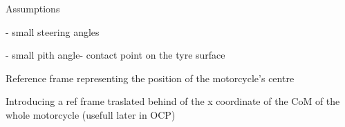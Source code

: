 \documentclass{article}
\begin{document}
\begin{maplegroup}
Assumptions
\end{maplegroup}
\begin{maplegroup}
\begin{Maple Normal}{
- small steering angles}\end{Maple Normal}

\begin{Maple Normal}{
- small pith angle- contact point on the tyre surface}\end{Maple Normal}
\end{maplegroup}
\begin{maplegroup}
\begin{Maple Normal}{
Reference frame representing the position of the motorcycle's centre}\end{Maple Normal}

\end{maplegroup}
\begin{maplegroup}
\begin{mapleinput}
\end{mapleinput}
\mapleresult
\begin{maplelatex}
\end{maplelatex}
\end{maplegroup}
\begin{maplegroup}
\begin{Maple Normal}{
Introducing a ref frame traslated behind of the x coordinate of the CoM of the whole motorcycle (usefull later in OCP)}\end{Maple Normal}

\end{maplegroup}
\end{document}
